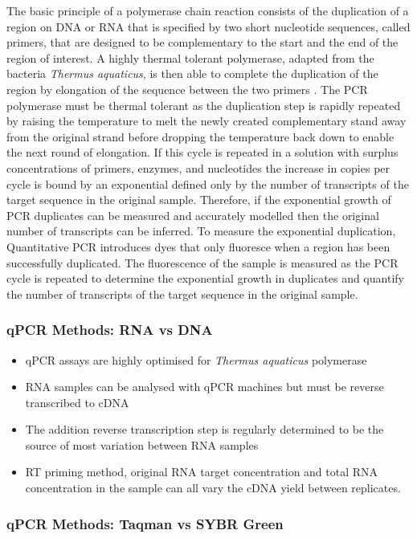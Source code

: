 \documentclass{SBCbookchapter}
\begin{document}
The basic principle of a polymerase chain reaction consists of the duplication of a region on DNA or RNA that is specified by two short nucleotide sequences, called primers, that are designed to be complementary to the start and the end of the region of interest. A highly thermal tolerant polymerase, adapted from the bacteria \textit{Thermus aquaticus}, is then able to complete the duplication of the region by elongation of the sequence between the two primers \cite{Holland1991}. The PCR polymerase must be thermal tolerant as the duplication step is rapidly repeated by raising the temperature to melt the newly created complementary stand away from the original strand before dropping the temperature back down to enable the next round of elongation. If this cycle is repeated in a solution with surplus concentrations of primers, enzymes, and nucleotides the increase in copies per cycle is bound by an exponential defined only by the number of transcripts of the target sequence in the original sample. Therefore, if the exponential growth of PCR duplicates can be measured and accurately modelled then the original number of transcripts can be inferred. To measure the exponential duplication, Quantitative PCR introduces dyes that only fluoresce when a region has been successfully duplicated. The fluorescence of the sample is measured as the PCR cycle is repeated to determine the exponential growth in duplicates and quantify the number of transcripts of the target sequence in the original sample.

\subsubsection{qPCR Methods: RNA vs DNA}

\begin{itemize}
    \item qPCR assays are highly optimised for \textit{Thermus aquaticus} polymerase
    \item RNA samples can be analysed with qPCR machines but must be reverse transcribed to cDNA
    \item The addition reverse transcription step is regularly determined to be the source of most variation between RNA samples \cite{Stahlberg2004}
    \item RT priming method, original RNA target concentration and total RNA concentration in the sample can all vary the cDNA yield between replicates.
\end{itemize}

\subsubsection{qPCR Methods: Taqman vs SYBR Green}
\end{document}
